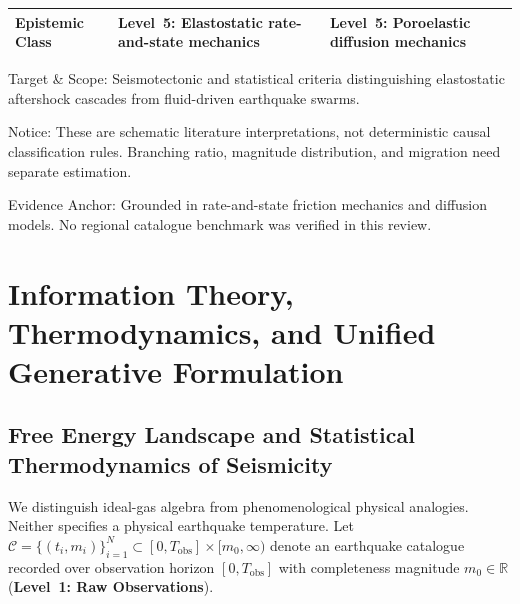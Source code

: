 \begin{table}[htbp]
\begin{threeparttable}
\begin{tabularx}{\textwidth}{l >{\raggedright\arraybackslash}X
      >{\raggedright\arraybackslash}X}
      \textbf{Epistemic Class} & Level~5: Elastostatic
      rate-and-state mechanics & Level~5: Poroelastic diffusion mechanics \\
      \bottomrule
    \end{tabularx}
    \begin{tablenotes}[flushleft]
      \footnotesize
    \item Target \& Scope: Seismotectonic and statistical criteria
      distinguishing elastostatic aftershock cascades from
      fluid-driven earthquake swarms.
    \item Notice: These are schematic literature interpretations, not
      deterministic causal classification rules. Branching ratio,
      magnitude distribution, and migration need separate estimation.
    \item Evidence Anchor: Grounded in rate-and-state friction
      mechanics and diffusion models. No regional catalogue benchmark
      was verified in this review.
    \end{tablenotes}
  \end{threeparttable}
\end{table}

\section{Information Theory, Thermodynamics, and Unified Generative
Formulation}
\label{sec:info_thermo_unified}

\subsection{Free Energy Landscape and Statistical Thermodynamics of Seismicity}
\label{subsec:free_energy_landscape}

We distinguish ideal-gas algebra from phenomenological physical analogies.
Neither specifies a physical earthquake temperature. Let $\mathcal{C} = \{(t_i,
m_i)\}_{i=1}^N \subset [0, T_{\mathrm{obs}}] \times [m_0, \infty)$
denote an earthquake catalogue recorded over observation horizon
$[0, T_{\mathrm{obs}}]$ with completeness magnitude $m_0 \in
\mathbb{R}$ (\textbf{Level~1: Raw Observations}).

